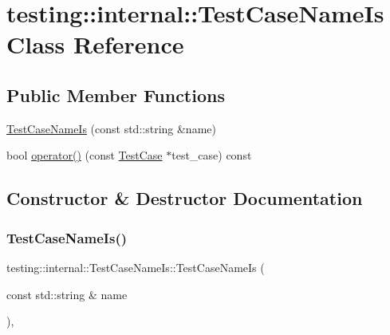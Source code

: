 \hypertarget{classtesting_1_1internal_1_1_test_case_name_is}{}\section{testing\+:\+:internal\+:\+:Test\+Case\+Name\+Is Class Reference}
\label{classtesting_1_1internal_1_1_test_case_name_is}
\subsection*{Public Member Functions}
\begin{DoxyCompactItemize}
\item 
\hyperlink{classtesting_1_1internal_1_1_test_case_name_is_a7c983707f4cfe7f36dbabc95da5113c4}{Test\+Case\+Name\+Is} (const std\+::string \&name)
\item 
bool \hyperlink{classtesting_1_1internal_1_1_test_case_name_is_aa96c4e9facbaa7043c8f0b34465d1eae}{operator()} (const \hyperlink{classtesting_1_1_test_case}{Test\+Case} $\ast$test\+\_\+case) const
\end{DoxyCompactItemize}


\subsection{Constructor \& Destructor Documentation}
\mbox{\label{classtesting_1_1internal_1_1_test_case_name_is_a7c983707f4cfe7f36dbabc95da5113c4}} 
\subsubsection{\texorpdfstring{Test\+Case\+Name\+Is()}{TestCaseNameIs()}}
{\footnotesize\ttfamily testing\+::internal\+::\+Test\+Case\+Name\+Is\+::\+Test\+Case\+Name\+Is (\begin{DoxyParamCaption}\item[{const std\+::string \&}]{name }\end{DoxyParamCaption})\hspace{0.3cm}{\ttfamily [inline]}, {\ttfamily [explicit]}}




